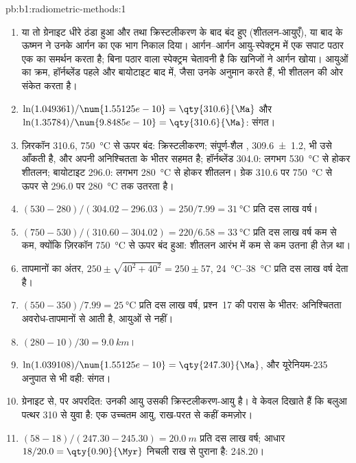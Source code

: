 \begin{solution}{pb:b1:radiometric-methods:1}
\begin{enumerate}
  \item या तो ग्रेनाइट धीरे ठंडा हुआ और  तथा  क्रिस्टलीकरण के बाद बंद हुए (शीतलन-आयुएँ), या बाद के ऊष्मन ने उनके आर्गन का एक भाग निकाल दिया। आर्गन–आर्गन आयु-स्पेक्ट्रम में एक सपाट पठार एक  का समर्थन करता है; बिना पठार वाला स्पेक्ट्रम चेतावनी है कि खनिजों ने आर्गन खोया। आयुओं का क्रम, हॉर्नब्लेंड पहले और बायोटाइट बाद में, जैसा उनके  अनुमान करते हैं, भी शीतलन की ओर संकेत करता है।
  \item $\ln(1.049361)/\num{1.55125e-10} = \qty{310.6}{\Ma}$ और
$\ln(1.35784)/\num{9.8485e-10} = \qty{310.6}{\Ma}$: संगत।
  \item ज़िरकॉन \qty{310.6}{\Ma}, \qty{750}{\celsius} से ऊपर बंद: क्रिस्टलीकरण; संपूर्ण-शैल , \qty[uncertainty-mode=separate]{309.6(12)}{\Ma}, भी उसे आँकती है, और अपनी अनिश्चितता के भीतर सहमत है; हॉर्नब्लेंड \qty{304.0}{\Ma}: लगभग \qty{530}{\celsius} से होकर शीतलन; बायोटाइट \qty{296.0}{\Ma}: लगभग \qty{280}{\celsius} से होकर शीतलन। ग्रेक \qty{310.6}{\Ma} पर \qty{750}{\celsius} से ऊपर से \qty{296.0}{\Ma} पर \qty{280}{\celsius} तक उतरता है।
  \item $(530 - 280)/(304.02 - 296.03) = 250/7.99 = \qty{31}{\celsius}$ प्रति दस लाख वर्ष।
  \item $(750 - 530)/(310.60 - 304.02) = 220/6.58 = \qty{33}{\celsius}$ प्रति दस लाख वर्ष कम से कम, क्योंकि ज़िरकॉन \qty{750}{\celsius} से ऊपर बंद हुआ: शीतलन आरंभ में कम से कम उतना ही तेज़ था।
  \item तापमानों का अंतर, $250 \pm \sqrt{40^2 + 40^2} = 250 \pm
        57$, \qtyrange{24}{38}{\celsius} प्रति दस लाख वर्ष देता है।
  \item $(550 - 350)/7.99 = \qty{25}{\celsius}$ प्रति दस लाख वर्ष, प्रश्न~17 की परास के भीतर: अनिश्चितता अवरोध-तापमानों से आती है, आयुओं से नहीं।
  \item $(280 - 10)/30 = \qty{9.0}{km}$।
  \item $\ln(1.039108)/\num{1.55125e-10} = \qty{247.30}{\Ma}$, और यूरेनियम-235 अनुपात से भी वही: संगत।
  \item ग्रेनाइट से,  पर अपरदित: उनकी आयु उसकी क्रिस्टलीकरण-आयु है। वे केवल दिखाते हैं कि बलुआ पत्थर \qty{310}{\Ma} से युवा है: एक उच्चतम आयु, राख-परत से कहीं कमज़ोर।
  \item $(58 - 18)/(247.30 - 245.30) = \qty{20.0}{m}$ प्रति दस लाख वर्ष; आधार $18/20.0 = \qty{0.90}{\Myr}$ निचली राख से पुराना है: \qty{248.20}{\Ma}।

\end{enumerate}
\end{solution}
